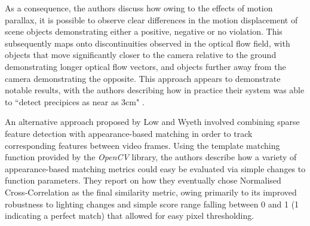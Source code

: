 As a consequence, the authors discuss how owing to the effects of motion parallax, it is possible to observe clear differences in the motion displacement of scene objects demonstrating either a positive, negative or no violation. This subsequently maps onto discontinuities observed in the optical flow field, with objects that move significantly closer to the camera relative to the ground demonstrating longer optical flow vectors, and objects further away from the camera demonstrating the opposite. This approach appears to demonstrate notable results, with the authors describing how in practice their system was able to ``detect precipices as near as 3cm" \cite{campbell}. 

An alternative approach proposed by Low and Wyeth \cite{wyeth} involved combining sparse feature detection with appearance-based matching in order to track corresponding features between video frames. Using the template matching function provided by the \textit{OpenCV} library, the authors describe how a variety of appearance-based matching metrics could easy be evaluated via simple changes to function parameters. They report on how they eventually chose Normalised Cross-Correlation as the final similarity metric, owing primarily to its improved robustness to lighting changes and simple score range falling between 0 and 1 (1 indicating a perfect match) that allowed for easy pixel thresholding.




